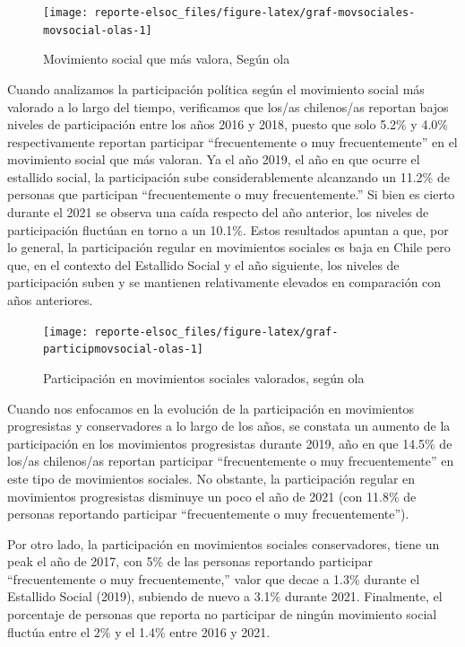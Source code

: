 \documentclass[
  12pt,
]{book}
\begin{document}
\begin{figure}

{\centering \texttt{[image: reporte-elsoc\_files/figure-latex/graf-movsociales-movsocial-olas-1]} 

}

\caption{Movimiento social que más valora, Según ola}\label{fig:graf-movsociales-movsocial-olas}
\end{figure}

Cuando analizamos la participación política según el movimiento social más valorado a lo largo del tiempo, verificamos que los/as chilenos/as reportan bajos niveles de participación entre los años 2016 y 2018, puesto que solo 5.2\% y 4.0\% respectivamente reportan participar ``frecuentemente o muy frecuentemente'' en el movimiento social que más valoran. Ya el año 2019, el año en que ocurre el estallido social, la participación sube considerablemente alcanzando un 11.2\% de personas que participan ``frecuentemente o muy frecuentemente.'' Si bien es cierto durante el 2021 se observa una caída respecto del año anterior, los niveles de participación fluctúan en torno a un 10.1\%. Estos resultados apuntan a que, por lo general, la participación regular en movimientos sociales es baja en Chile pero que, en el contexto del Estallido Social y el año siguiente, los niveles de participación suben y se mantienen relativamente elevados en comparación con años anteriores.

\begin{figure}

{\centering \texttt{[image: reporte-elsoc\_files/figure-latex/graf-participmovsocial-olas-1]} 

}

\caption{Participación en movimientos sociales valorados, según ola}\label{fig:graf-participmovsocial-olas}
\end{figure}

Cuando nos enfocamos en la evolución de la participación en movimientos progresistas y conservadores a lo largo de los años, se constata un aumento de la participación en los movimientos progresistas durante 2019, año en que 14.5\% de los/as chilenos/as reportan participar ``frecuentemente o muy frecuentemente'' en este tipo de movimientos sociales. No obstante, la participación regular en movimientos progresistas disminuye un poco el año de 2021 (con 11.8\% de personas reportando participar ``frecuentemente o muy frecuentemente'').

Por otro lado, la participación en movimientos sociales conservadores, tiene un peak el año de 2017, con 5\% de las personas reportando participar ``frecuentemente o muy frecuentemente,'' valor que decae a 1.3\% durante el Estallido Social (2019), subiendo de nuevo a 3.1\% durante 2021. Finalmente, el porcentaje de personas que reporta no participar de ningún movimiento social fluctúa entre el 2\% y el 1.4\% entre 2016 y 2021.
\end{document}
